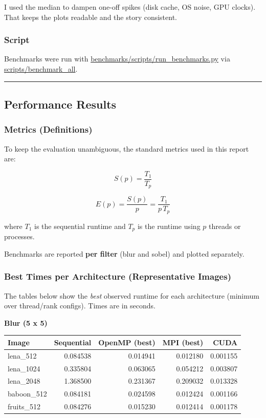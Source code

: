\documentclass[
]{article}
\begin{document}
I used the median to dampen one-off spikes (disk cache, OS noise, GPU
clocks). That keeps the plots readable and the story consistent.

\subsubsection{Script}\label{script}

Benchmarks were run with \url{benchmarks/scripts/run_benchmarks.py} via
\url{scripts/benchmark_all}.

\begin{center}\rule{0.5\linewidth}{0.5pt}\end{center}

\subsection{Performance Results}\label{performance-results}

\subsubsection{Metrics (Definitions)}\label{metrics-definitions}

To keep the evaluation unambiguous, the standard metrics used in this
report are:

\[S(p)=\frac{T_1}{T_p}\]

\[E(p)=\frac{S(p)}{p}=\frac{T_1}{p\,T_p}\]

where \(T_1\) is the sequential runtime and \(T_p\) is the runtime using
\(p\) threads or processes.

Benchmarks are reported \textbf{per filter} (blur and sobel) and plotted
separately.

\subsubsection{Best Times per Architecture (Representative
Images)}\label{best-times-per-architecture-representative-images}

The tables below show the \emph{best} observed runtime for each
architecture (minimum over thread/rank configs). Times are in seconds.

\textbf{Blur (5 x 5)}

\begin{longtable}[]{@{}lrrrr@{}}
\toprule\noalign{}
Image & Sequential & OpenMP (best) & MPI (best) & CUDA \\
\midrule\noalign{}
\endhead
\bottomrule\noalign{}
\endlastfoot
lena\_512 & 0.084538 & 0.014941 & 0.012180 & 0.001155 \\
lena\_1024 & 0.335804 & 0.063065 & 0.054212 & 0.003807 \\
lena\_2048 & 1.368500 & 0.231367 & 0.209032 & 0.013328 \\
baboon\_512 & 0.084181 & 0.024598 & 0.012424 & 0.001166 \\
fruits\_512 & 0.084276 & 0.015230 & 0.012414 & 0.001178 \\
\end{longtable}
\end{document}
